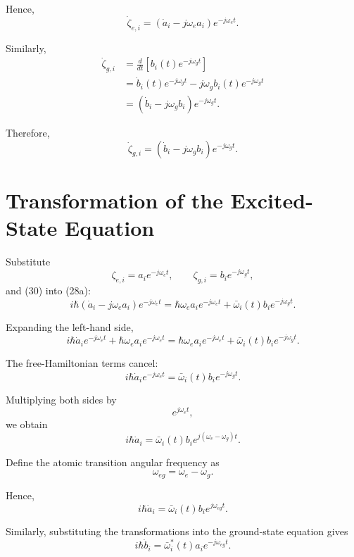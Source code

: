 \documentclass[12pt,a4paper]{article}
\begin{document}
Hence,
\begin{equation}
\boxed{
\dot{\zeta}_{e,i}
=
\left(
\dot a_i-j\omega_ea_i
\right)
e^{-j\omega_e t}.
}
\tag{30}
\end{equation}

Similarly,
\[
\begin{aligned}
\dot{\zeta}_{g,i}
&=
\frac{d}{dt}
\left[
b_i(t)e^{-j\omega_g t}
\right]\\
&=
\dot b_i(t)e^{-j\omega_g t}
-
j\omega_gb_i(t)e^{-j\omega_g t}\\
&=
\left(
\dot b_i-j\omega_gb_i
\right)
e^{-j\omega_g t}.
\end{aligned}
\]

Therefore,
\begin{equation}
\boxed{
\dot{\zeta}_{g,i}
=
\left(
\dot b_i-j\omega_gb_i
\right)
e^{-j\omega_g t}.
}
\tag{31}
\end{equation}

\section{Transformation of the Excited-State Equation}

Substitute
\[
\zeta_{e,i}
=
a_i e^{-j\omega_e t},
\qquad
\zeta_{g,i}
=
b_i e^{-j\omega_g t},
\]
and (30) into (28a):
\[
i\hbar
\left(
\dot a_i-j\omega_ea_i
\right)
e^{-j\omega_e t}
=
\hbar\omega_e
a_i e^{-j\omega_e t}
+
\bar{\omega}_i(t)
b_i e^{-j\omega_g t}.
\]

Expanding the left-hand side,
\[
i\hbar\dot a_i e^{-j\omega_e t}
+
\hbar\omega_ea_i e^{-j\omega_e t}
=
\hbar\omega_ea_i e^{-j\omega_e t}
+
\bar{\omega}_i(t)b_i e^{-j\omega_g t}.
\]

The free-Hamiltonian terms cancel:
\[
i\hbar\dot a_i e^{-j\omega_e t}
=
\bar{\omega}_i(t)b_i e^{-j\omega_g t}.
\]

Multiplying both sides by
\[
e^{j\omega_e t},
\]
we obtain
\[
i\hbar\dot a_i
=
\bar{\omega}_i(t)b_i
e^{j(\omega_e-\omega_g)t}.
\]

Define the atomic transition angular frequency as
\begin{equation}
\boxed{
\omega_{eg}
=
\omega_e-\omega_g.
}
\tag{32}
\end{equation}

Hence,
\begin{equation}
\boxed{
i\hbar\dot a_i
=
\bar{\omega}_i(t)
b_i
e^{j\omega_{eg}t}.
}
\tag{33}
\end{equation}

Similarly, substituting the transformations into the ground-state
equation gives
\begin{equation}
\boxed{
i\hbar\dot b_i
=
\bar{\omega}_i^{*}(t)
a_i
e^{-j\omega_{eg}t}.
}
\tag{34}
\end{equation}
\end{document}
